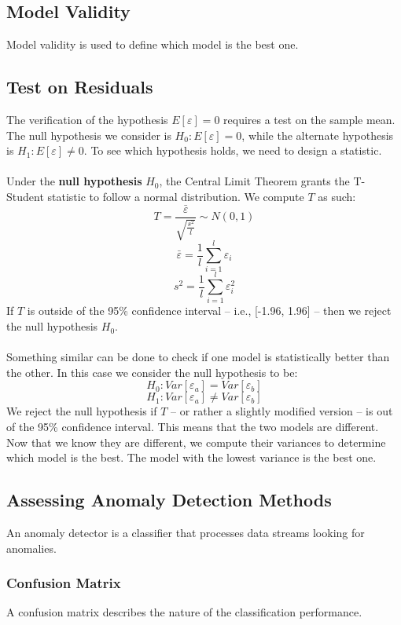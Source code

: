\documentclass{article}
\begin{document}
\subsection{Model Validity}
Model validity is used to define which model is the best one.

\subsection{Test on Residuals}
The verification of the hypothesis $E[\varepsilon] = 0$ requires a test on the sample mean. The null hypothesis we consider is $H_0 : E[\varepsilon] = 0$, while the alternate hypothesis is $H_1 : E[\varepsilon] \not = 0$. To see which hypothesis holds, we need to design a statistic. \\ \\
Under the \textbf{null hypothesis} $H_0$, the Central Limit Theorem grants the T-Student statistic to follow a normal distribution. We compute $T$ as such:
\[ T = \frac{\bar \varepsilon}{\sqrt{\frac{s^2}{l}}} \sim N(0,1) \]
\[ \bar\varepsilon = \frac{1}{l} \sum^l_{i = 1} \varepsilon_i \]
\[ s^2 = \frac{1}{l} \sum^l_{i = 1} \varepsilon^2_i \]
If $T$ is outside of the 95\% confidence interval -- i.e., [-1.96, 1.96] -- then we reject the null hypothesis $H_0$. \\ \\
Something similar can be done to check if one model is statistically better than the other. In this case we consider the null hypothesis to be:
\[ H_0 : Var[\varepsilon_a] = Var[\varepsilon_b] \]
\[ H_1 : Var[\varepsilon_a] \not = Var[\varepsilon_b] \]
We reject the null hypothesis if $T$ -- or rather a slightly modified version -- is out of the 95\% confidence interval. This means that the two models are different. Now that we know they are different, we compute their variances to determine which model is the best. The model with the lowest variance is the best one.

\subsection{Assessing Anomaly Detection Methods}
An anomaly detector is a classifier that processes data streams looking for anomalies.

\subsubsection{Confusion Matrix}
A confusion matrix describes the nature of the classification performance.
\end{document}
